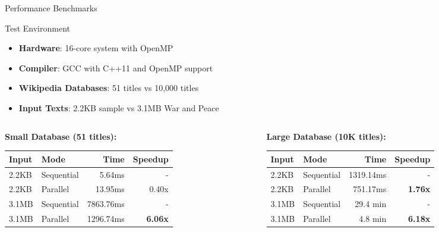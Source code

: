 \documentclass[aspectratio=169]{beamer}
\begin{document}
\begin{frame}{Performance Benchmarks}
\begin{block}{Test Environment}
\begin{itemize}
    \item \textbf{Hardware}: 16-core system with OpenMP
    \item \textbf{Compiler}: GCC with C++11 and OpenMP support
    \item \textbf{Wikipedia Databases}: 51 titles vs 10,000 titles
    \item \textbf{Input Texts}: 2.2KB sample vs 3.1MB War and Peace
\end{itemize}
\end{block}

\begin{columns}
\begin{column}{0.5\textwidth}
\textbf{Small Database (51 titles):}
\begin{table}[h]
\tiny
\begin{tabular}{|l|l|r|r|}
\hline
\textbf{Input} & \textbf{Mode} & \textbf{Time} & \textbf{Speedup} \\
\hline
2.2KB & Sequential & 5.64ms & - \\
2.2KB & Parallel & 13.95ms & 0.40x \\
\hline
3.1MB & Sequential & 7863.76ms & - \\
3.1MB & Parallel & 1296.74ms & \textbf{6.06x} \\
\hline
\end{tabular}
\end{table}
\end{column}
\begin{column}{0.5\textwidth}
\textbf{Large Database (10K titles):}
\begin{table}[h]
\tiny
\begin{tabular}{|l|l|r|r|}
\hline
\textbf{Input} & \textbf{Mode} & \textbf{Time} & \textbf{Speedup} \\
\hline
2.2KB & Sequential & 1319.14ms & - \\
2.2KB & Parallel & 751.17ms & \textbf{1.76x} \\
\hline
3.1MB & Sequential & 29.4 min & - \\
3.1MB & Parallel & 4.8 min & \textbf{6.18x} \\
\hline
\end{tabular}
\end{table}
\end{column}
\end{columns}
\end{frame}
\end{document}
